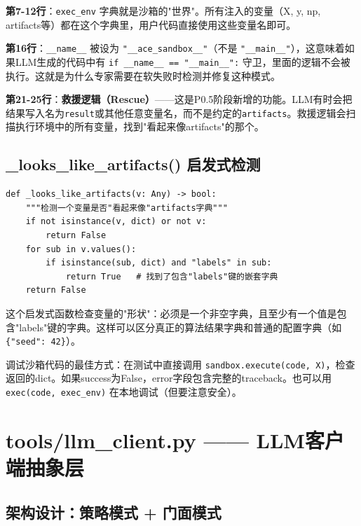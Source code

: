 \documentclass[11pt,a4paper]{ctexbook}
\begin{document}
\textbf{第7-12行}：\verb|exec_env| 字典就是沙箱的"世界"。所有注入的变量（X, y, np, artifacts等）都在这个字典里，用户代码直接使用这些变量名即可。

\textbf{第16行}：\verb|__name__| 被设为 \verb|"__ace_sandbox__"|（不是 \verb|"__main__"|），这意味着如果LLM生成的代码中有 \verb|if __name__ == "__main__":| 守卫，里面的逻辑不会被执行。这就是为什么专家需要在软失败时检测并修复这种模式。

\textbf{第21-25行}：\textbf{救援逻辑（Rescue）}——这是P0.5阶段新增的功能。LLM有时会把结果写入名为\verb|result|或其他任意变量名，而不是约定的\verb|artifacts|。救援逻辑会扫描执行环境中的所有变量，找到"看起来像artifacts"的那个。

\subsection{\_looks\_like\_artifacts() 启发式检测}

\begin{verbatim}
def _looks_like_artifacts(v: Any) -> bool:
    """检测一个变量是否"看起来像"artifacts字典"""
    if not isinstance(v, dict) or not v:
        return False
    for sub in v.values():
        if isinstance(sub, dict) and "labels" in sub:
            return True   # 找到了包含"labels"键的嵌套字典
    return False
\end{verbatim}

这个启发式函数检查变量的"形状"：必须是一个非空字典，且至少有一个值是包含"labels"键的字典。这样可以区分真正的算法结果字典和普通的配置字典（如\verb|{"seed": 42}|）。

\begin{tipbox}
    调试沙箱代码的最佳方式：在测试中直接调用 \texttt{sandbox.execute(code, X)}，检查返回的dict。如果success为False，error字段包含完整的traceback。也可以用 \texttt{exec(code, exec\_env)} 在本地调试（但要注意安全）。
\end{tipbox}

\section{tools/llm\_client.py —— LLM客户端抽象层}

\subsection{架构设计：策略模式 + 门面模式}
\end{document}

